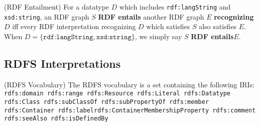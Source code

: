 \documentclass{article}
\begin{document}
\begin{defin}(RDF Entailment)\newline
For a datatype $D$ which includes \texttt{rdf:langString} and \texttt{xsd:string}, an RDF graph $S$ \textbf{RDF entails} another RDF graph $E$ \textbf{recognizing $D$} iff every RDF interpretation recognizing $D$ which satisfies $S$ also satisfies $E$. When $D = \{\texttt{rdf:langString}, \texttt{xsd:string}\}$, we simply say $S$ \textbf{RDF entails}$E$.
\end{defin}

\newpage 
\subsection{RDFS Interpretations}
\begin{defin}(RDFS Vocabulary)
The RDFS vocabulary is a set containing the following IRIs:\newline
\texttt{rdfs:domain rdfs:range rdfs:Resource rdfs:Literal rdfs:Datatype rdfs:Class rdfs:subClassOf rdfs:subPropertyOf rdfs:member rdfs:Container rdfs:label\newline rdfs:ContainerMembershipProperty rdfs:comment rdfs:seeAlso rdfs:isDefinedBy }
\end{defin}
\end{document}

